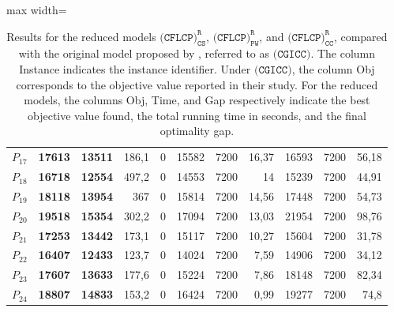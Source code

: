 \documentclass[preprint,11pt,authoryear]{elsarticle}
\newcommand\red[1]{{\color{red}#1}}
\begin{document}
\begin{table}
\begin{adjustbox}{max width=\textwidth}
\begin{tabular}{c r rrr rrr rrr}
$P_{17}$&\textbf{17613}&\textbf{13511}&186,1&0&15582&7200&16,37&16593&7200&56,18 \\
$P_{18}$&\textbf{16718}&\textbf{12554}&497,2&0&14553&7200&14&15239&7200&44,91 \\
$P_{19}$&\textbf{18118}&\textbf{13954}&367&0&15814&7200&14,56&17448&7200&54,73 \\
$P_{20}$&\textbf{19518}&\textbf{15354}&302,2&0&17094&7200&13,03&21954&7200&98,76 \\[2mm]
$P_{21}$&\textbf{17253}&\textbf{13442}&173,1&0&15117&7200&10,27&15604&7200&31,78 \\
$P_{22}$&\textbf{16407}&\textbf{12433}&123,7&0&14024&7200&7,59&14906&7200&34,12 \\
$P_{23}$&\textbf{17607}&\textbf{13633}&177,6&0&15224&7200&7,86&18148&7200&82,34 \\
$P_{24}$&\textbf{18807}&\textbf{14833}&153,2&0&16424&7200&0,99&19277&7200&74,8 \\

\bottomrule
\end{tabular}
\end{adjustbox}
\caption{Results for the reduced models \(\texttt{(CFLCP)}_{\texttt{CS}}^\texttt{R}\), \(\texttt{(CFLCP)}_{\texttt{PW}}^\texttt{R}\), and \(\texttt{(CFLCP)}_{\texttt{CC}}^\texttt{R}\), compared with the original model proposed by \cite{calvete2020}, referred to as $\texttt{(CGICC)}$. The column Instance indicates the instance identifier. Under $\texttt{(CGICC)}$, the column Obj corresponds to the objective value reported in their study. For the reduced models, the columns Obj, Time, and Gap respectively indicate the best objective value found, the total running time in seconds, and the final optimality gap.}
\label{tab:calvete-results}
\end{table}
\end{document}

